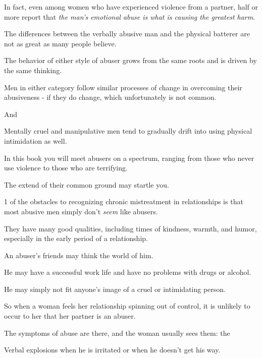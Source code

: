 \documentclass[oneside]{article}
\numberwithin{equation}{section}
\begin{document}

In fact, even among women who have experienced violence from a partner, half or more report that \textit{the man's emotional abuse is what is causing the greatest harm}.

%
The differences between the verbally abusive man and the physical batterer are not as great as many people believe.

The behavior of either style of abuser grows from the same roots and is driven by the same thinking.

Men in either category follow similar processes of change in overcoming their abusiveness - if they do change, which unfortunately is not common.

And 


Mentally cruel and manipulative men tend to gradually drift into using physical intimidation as well.

In this book you will meet abusers on a spectrum, ranging from those who never use violence to those who are terrifying.

The extend of their common ground may startle you.

%
1 of the obstacles to recognizing chronic mistreatment in relationships is that most abusive men simply don't \textit{seem} like abusers.

They have many good qualities, including times of kindness, warmth, and humor, especially in the early period of a relationship.

An abuser's friends may think the world of him.

He may have a successful work life and have no problems with drugs or alcohol.

He may simply not fit anyone's image of a cruel or intimidating person.

So when a woman feels her relationship spinning out of control, it is unlikely to occur to her that her partner is an abuser.

%
The symptoms of abuse are there, and the woman usually sees them: the 


Verbal explosions when he is irritated or when he doesn't get his way.
\end{document}
